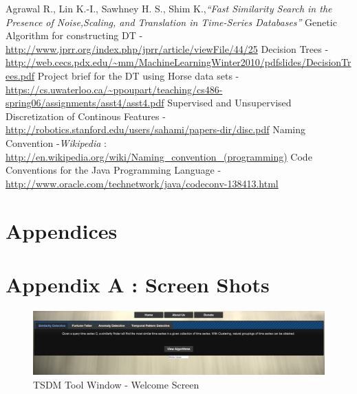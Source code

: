 \documentclass[12pt]{report}
\begin{document}
\begin{thebibliography}{refs}
Agrawal R., Lin K.-I., Sawhney H. S., Shim K.,\textit{“Fast Similarity Search in the Presence of Noise,Scaling, and Translation in Time-Series Databases”}
Genetic Algorithm for constructing DT - \url{http://www.jprr.org/index.php/jprr/article/viewFile/44/25}
Decision Trees - \url{http://web.cecs.pdx.edu/~mm/MachineLearningWinter2010/pdfslides/DecisionTrees.pdf}
 Project brief for the DT  using Horse data sets  - \url{https://cs.uwaterloo.ca/~ppoupart/teaching/cs486-spring06/assignments/asst4/asst4.pdf}
Supervised and Unsupervised Discretization of Continous Features - \url{http://robotics.stanford.edu/users/sahami/papers-dir/disc.pdf}
Naming Convention -\textit{Wikipedia} :  \url{http://en.wikipedia.org/wiki/Naming_convention_(programming)}
Code Conventions for the Java Programming Language - \url{http://www.oracle.com/technetwork/java/codeconv-138413.html}


\end{thebibliography}

\newpage
\pagestyle{fancy}
\chead{}
\rfoot{\small{\thepage}}
\renewcommand{\headrulewidth}{0.4pt}
\renewcommand{\footrulewidth}{0.4pt}

\section*{Appendices}
\section*{Appendix A : Screen Shots}
\begin{figure}[h!]

  \centering
    \includegraphics[scale=0.35]{./screenshots/welcome_screen.png}
  \caption{TSDM Tool Window - Welcome Screen}
\end{figure}
\end{document}
